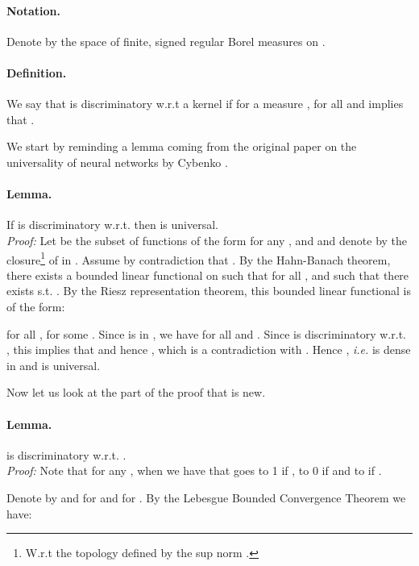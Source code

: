 \documentclass[letterpaper]{article} \usepackage{aaai22}  \usepackage{times}  \usepackage{helvet}  \usepackage{courier}  \usepackage[hyphens]{url}  \usepackage{graphicx} \urlstyle{rm} \def\UrlFont{\rm}  \usepackage{natbib}  \usepackage{caption} \DeclareCaptionStyle{ruled}{labelfont=normalfont,labelsep=colon,strut=off} \frenchspacing  \setlength{\pdfpagewidth}{8.5in}  \setlength{\pdfpageheight}{11in}  \usepackage{algorithm}
\begin{document}
\paragraph{Notation.} Denote by  the space of finite, signed regular Borel measures on . 

\paragraph{Definition.} We say that  is discriminatory w.r.t a kernel  if for a measure ,  for all  and  implies that .

We start by reminding a lemma coming from the original paper on the universality of neural networks by Cybenko \cite{cybenko1989approximation}.\\

\paragraph{Lemma.} If  is discriminatory w.r.t.  then  is universal.\\

\textit{Proof:} Let  be the subset of functions of the form  for any ,  and  and denote by  the closure\footnote{W.r.t the topology defined by the sup norm .} of  in . Assume by contradiction that . By the Hahn-Banach theorem, there exists a bounded linear functional  on  such that for all ,  and such that there exists  s.t. . By the Riesz representation theorem, this bounded linear functional is of the form:

for all , for some . Since  is in , we have   for all  and . Since  is discriminatory w.r.t. , this implies that  and hence , which is a contradiction with . Hence , \textit{i.e.}  is dense in  and  is universal.
\begin{flushright}

\end{flushright}

\noindent Now let us look at the part of the proof that is new.

\paragraph{Lemma.}  is discriminatory w.r.t. .\\

\textit{Proof:} Note that for any , when  we have that  goes to 1 if , to 0 if  and to  if . 

Denote by  and  for  and  for . By the Lebesgue Bounded Convergence Theorem we have: 
\end{document}

